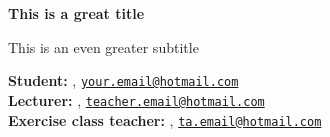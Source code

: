 







    

\begin{Large}
    \textsf{\textbf{This is a great title}}
    
    This is an even greater subtitle
\end{Large}

\vspace{1ex}

\textsf{\textbf{Student:}} , \href{mailto:your.email@hotmail.com}{\texttt{your.email@hotmail.com}}\\
\textsf{\textbf{Lecturer:}} , \href{mailto:teacher.email@hotmail.com}{\texttt{teacher.email@hotmail.com}}\\
\textsf{\textbf{Exercise class teacher:}} , \href{mailto:ta.email@hotmail.com}{\texttt{ta.email@hotmail.com}}


\vspace{5.25ex}



 \newpage








